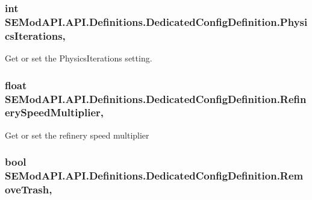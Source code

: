 \subsubsection[{Physics\+Iterations}]{\setlength{\rightskip}{0pt plus 5cm}int S\+E\+Mod\+A\+P\+I.\+A\+P\+I.\+Definitions.\+Dedicated\+Config\+Definition.\+Physics\+Iterations\hspace{0.3cm}{\ttfamily [get]}, {\ttfamily [set]}}\label{class_s_e_mod_a_p_i_1_1_a_p_i_1_1_definitions_1_1_dedicated_config_definition_a36f4f1a37f4488d78b4df3bd957cd392}


Get or set the Physics\+Iterations setting. 

\hypertarget{class_s_e_mod_a_p_i_1_1_a_p_i_1_1_definitions_1_1_dedicated_config_definition_a3e3cfaefe4e92f00cdafafd55569569f}{}
\subsubsection[{Refinery\+Speed\+Multiplier}]{\setlength{\rightskip}{0pt plus 5cm}float S\+E\+Mod\+A\+P\+I.\+A\+P\+I.\+Definitions.\+Dedicated\+Config\+Definition.\+Refinery\+Speed\+Multiplier\hspace{0.3cm}{\ttfamily [get]}, {\ttfamily [set]}}\label{class_s_e_mod_a_p_i_1_1_a_p_i_1_1_definitions_1_1_dedicated_config_definition_a3e3cfaefe4e92f00cdafafd55569569f}


Get or set the refinery speed multiplier 

\hypertarget{class_s_e_mod_a_p_i_1_1_a_p_i_1_1_definitions_1_1_dedicated_config_definition_a3015e02cd21ec214c9549af6b1919a67}{}
\subsubsection[{Remove\+Trash}]{\setlength{\rightskip}{0pt plus 5cm}bool S\+E\+Mod\+A\+P\+I.\+A\+P\+I.\+Definitions.\+Dedicated\+Config\+Definition.\+Remove\+Trash\hspace{0.3cm}{\ttfamily [get]}, {\ttfamily [set]}}\label{class_s_e_mod_a_p_i_1_1_a_p_i_1_1_definitions_1_1_dedicated_config_definition_a3015e02cd21ec214c9549af6b1919a67}


